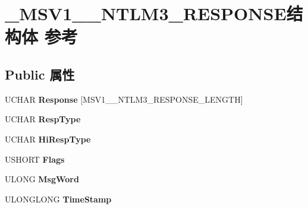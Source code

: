 \hypertarget{struct___m_s_v1__0___n_t_l_m3___r_e_s_p_o_n_s_e}{}\section{\+\_\+\+M\+S\+V1\+\_\+\_\+\+N\+T\+L\+M3\+\_\+\+R\+E\+S\+P\+O\+N\+S\+E结构体 参考}
\label{struct___m_s_v1__0___n_t_l_m3___r_e_s_p_o_n_s_e}
\subsection*{Public 属性}
\begin{DoxyCompactItemize}
\item 
\mbox{\label{struct___m_s_v1__0___n_t_l_m3___r_e_s_p_o_n_s_e_aca17535e101567642341df5b6937ac4a}} 
U\+C\+H\+AR {\bfseries Response} \mbox{[}M\+S\+V1\+\_\+\_\+\+N\+T\+L\+M3\+\_\+\+R\+E\+S\+P\+O\+N\+S\+E\+\_\+\+L\+E\+N\+G\+TH\mbox{]}
\item 
\mbox{\label{struct___m_s_v1__0___n_t_l_m3___r_e_s_p_o_n_s_e_abeb9efb2247c8efd6439c6f4cd02b7f0}} 
U\+C\+H\+AR {\bfseries Resp\+Type}
\item 
\mbox{\label{struct___m_s_v1__0___n_t_l_m3___r_e_s_p_o_n_s_e_a53c1165c11d2673b01ab0cbf3a64ea47}} 
U\+C\+H\+AR {\bfseries Hi\+Resp\+Type}
\item 
\mbox{\label{struct___m_s_v1__0___n_t_l_m3___r_e_s_p_o_n_s_e_a4bd44054195ade21482bf5ffee5fe8c9}} 
U\+S\+H\+O\+RT {\bfseries Flags}
\item 
\mbox{\label{struct___m_s_v1__0___n_t_l_m3___r_e_s_p_o_n_s_e_a15fe1c04f7c8288108743e2631e19a49}} 
U\+L\+O\+NG {\bfseries Msg\+Word}
\item 
\mbox{\label{struct___m_s_v1__0___n_t_l_m3___r_e_s_p_o_n_s_e_a25d6a6a904000409f19598fe4b4fb5a7}} 
U\+L\+O\+N\+G\+L\+O\+NG {\bfseries Time\+Stamp}
\item 
\mbox{\label{struct___m_s_v1__0___n_t_l_m3___r_e_s_p_o_n_s_e_aa47c93a2c3b8a9aa2410a970cbeb39c1}} 

\end{DoxyCompactItemize}
